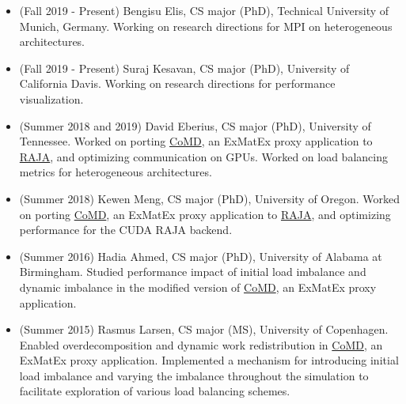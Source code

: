 {\begin{itemize}
		  Worked on interactive tree visualization for \href{https://llnl-hatchet.readthedocs.io/en/latest/}{Hatchet},
	          a call-tree based tool for performance analysis of HPC applications.
		\item (Fall 2019 - Present) Bengisu Elis, CS major (PhD), Technical University of Munich, Germany.
		  Working on research directions for MPI on heterogeneous architectures.
		\item (Fall 2019 - Present) Suraj Kesavan, CS major (PhD), University of California Davis.
		    Working on research directions for performance visualization.	          
		\item (Summer 2018 and 2019) David Eberius, CS major (PhD), University of Tennessee.
		  Worked on porting \href{http://www.exmatex.org/comd.html}{CoMD}, an ExMatEx proxy application to
		  \href{https://github.com/LLNL/RAJA}{RAJA}, and optimizing communication on GPUs.
		  Worked on load balancing metrics for heterogeneous architectures.
		\item (Summer 2018) Kewen Meng, CS major (PhD), University of Oregon.
		  Worked on porting \href{http://www.exmatex.org/comd.html}{CoMD}, an ExMatEx proxy application to
		  \href{https://github.com/LLNL/RAJA}{RAJA},
		  and optimizing performance for the CUDA RAJA backend.
		\item (Summer 2016) Hadia Ahmed, CS major (PhD), University of Alabama at Birmingham.
		  Studied performance impact of initial load imbalance and dynamic imbalance in the modified version of
		  \href{http://www.exmatex.org/comd.html}{CoMD}, an ExMatEx proxy application.
		\item (Summer 2015) Rasmus Larsen, CS major (MS), University of Copenhagen. %
		  Enabled overdecomposition and dynamic work redistribution in
		  \href{http://www.exmatex.org/comd.html}{CoMD}, an ExMatEx proxy application.
		  Implemented a mechanism for introducing initial load imbalance and
		  varying the imbalance throughout the simulation
		  to facilitate exploration of various load balancing schemes.
		\end{itemize}
	}
